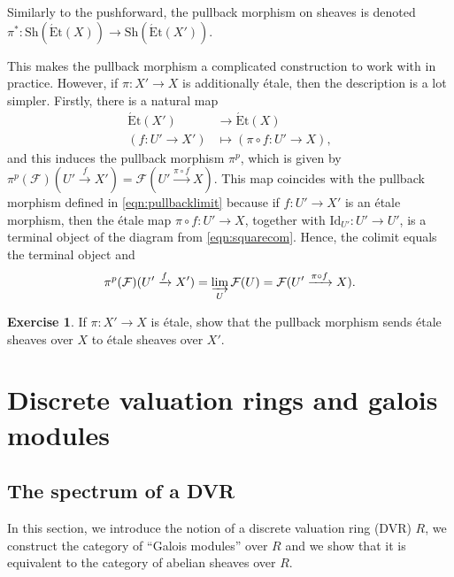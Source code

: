\documentclass{article}
\newcommand{\Et}{\acute{\mathrm{E}}\mathrm{t}}
\newcommand{\Sh}{\mathrm{Sh}}
\newcommand{\Id}{\mathrm{Id}}
\theoremstyle{plain}
\theoremstyle{definition}
\newtheorem*{exercise}{Exercise}
\begin{document}
    Similarly to the pushforward, the pullback morphism on sheaves is denoted $\pi^*:\Sh(\Et(X))\rightarrow\Sh(\Et(X'))$.

    This makes the pullback morphism a complicated construction to work with in practice. However, if $\pi:X'\to X$ is additionally \'{e}tale, then the description is a lot simpler. Firstly, there is a natural map
    \begin{align*}
        \Et(X')&\longrightarrow\Et(X)\\
        (f:U'\to X')&\longmapsto(\pi\circ f:U'\to X),
    \end{align*}
    and this induces the pullback morphism $\pi^p$, which is given by $\pi^p(\mathcal{F})(U'\xrightarrow{f}X')=\mathcal{F}(U'\xrightarrow{\pi\circ f}X)$. This map coincides with the pullback morphism defined in \eqref{eqn:pullbacklimit} because if $f:U'\to X'$ is an \'{e}tale morphism, then the \'{e}tale map $\pi\circ f:U'\to X$, together with $\Id_{U'}:U'\to U'$, is a terminal object of the diagram from \eqref{eqn:squarecom}. Hence, the colimit equals the terminal object and
    $$\pi^p(\mathcal{F})(U'\xrightarrow{f}X')=\varinjlim_U\mathcal{F}(U)=\mathcal{F}(U'\xrightarrow{\pi\circ f}X).$$ 
    \begin{exercise}
        If $\pi:X'\to X$ is \'{e}tale, show that the pullback morphism sends \'{e}tale sheaves over $X$ to \'{e}tale sheaves over $X'$. 
    \end{exercise}

    \section{Discrete valuation rings and galois modules}
    \subsection{The spectrum of a DVR}
    In this section, we introduce the notion of a discrete valuation ring (DVR) $R$, we construct the category of ``Galois modules'' over $R$ and we show that it is equivalent to the category of abelian sheaves over $R$.
\end{document}
